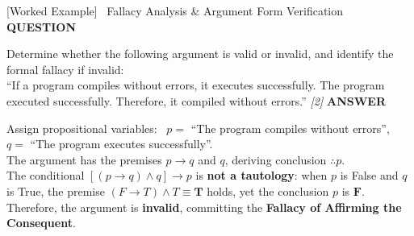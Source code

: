 \documentclass[11pt,a4paper]{article}
\newcommand{\Qlabel}{\textbf{\color{navy}\footnotesize\MakeUppercase{Question}}\par\smallskip}
\newcommand{\Alabel}{\textbf{\color{teal}\footnotesize\MakeUppercase{Answer}}\par\smallskip}
\begin{document}
\begin{exambox}{[Worked Example] \ Fallacy Analysis \& Argument Form Verification}
\Qlabel
Determine whether the following argument is valid or invalid, and identify the formal fallacy if invalid:\\
``If a program compiles without errors, it executes successfully. The program executed successfully. Therefore, it compiled without errors.'' \hfill\textit{[2]}
\tcblower
\Alabel
Assign propositional variables: \ $p =$ ``The program compiles without errors'', \ $q =$ ``The program executes successfully''.\\
The argument has the premises $p \rightarrow q$ and $q$, deriving conclusion $\therefore p$.\\
The conditional $[(p \rightarrow q) \wedge q] \rightarrow p$ is \textbf{not a tautology}: when $p$ is False and $q$ is True, the premise $(F \rightarrow T) \wedge T \equiv \mathbf{T}$ holds, yet the conclusion $p$ is $\mathbf{F}$.\\
Therefore, the argument is \textbf{invalid}, committing the \textbf{Fallacy of Affirming the Consequent}.
\end{exambox}

\newpage
\end{document}
